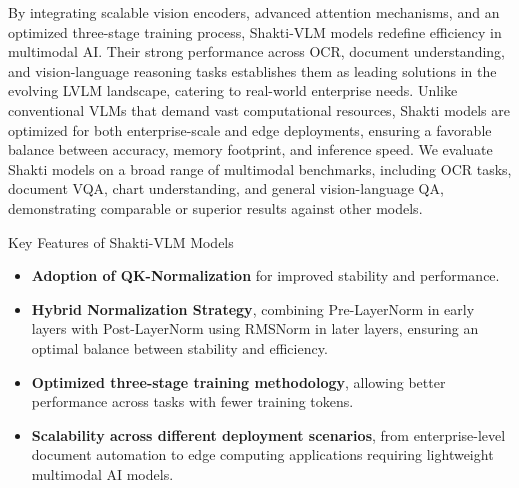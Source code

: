\documentclass{article}
\begin{document}
By integrating scalable vision encoders, advanced attention mechanisms, and an optimized three-stage training process, Shakti-VLM models redefine efficiency in multimodal AI. Their strong performance across OCR, document understanding, and vision-language reasoning tasks establishes them as leading solutions in the evolving LVLM landscape, catering to real-world enterprise needs. Unlike conventional VLMs that demand vast computational resources, Shakti models are optimized for both enterprise-scale and edge deployments, ensuring a favorable balance between accuracy, memory footprint, and inference speed. We evaluate Shakti models on a broad range of multimodal benchmarks, including OCR tasks, document VQA, chart understanding, and general vision-language QA, demonstrating comparable or superior results against other models.


Key Features of Shakti-VLM Models

\begin{itemize}
    \item \textbf{Adoption of QK-Normalization} for improved stability and performance.
    \item \textbf{Hybrid Normalization Strategy}, combining Pre-LayerNorm in early layers with Post-LayerNorm using RMSNorm in later layers, ensuring an optimal balance between stability and efficiency.
    \item \textbf{Optimized three-stage training methodology}, allowing better performance across tasks with fewer training tokens.
    \item \textbf{Scalability across different deployment scenarios}, from enterprise-level document automation to edge computing applications requiring lightweight multimodal AI models.
\end{itemize}


\end{document}
